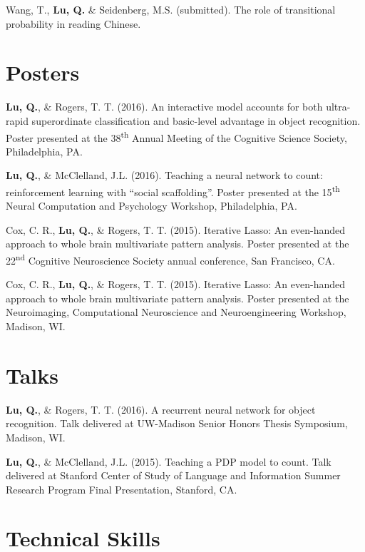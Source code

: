 \documentclass[11pt,a4paper,sans]{moderncv}        %
\newcommand{\ts}{\textsuperscript}
\begin{document}
\hangindent=0.7cm
Wang, T., \textbf{Lu, Q.} \& Seidenberg, M.S. (submitted). The role of transitional probability in reading Chinese. 



\section{Posters}
\hangindent=0.7cm
\textbf{Lu, Q.}, \& Rogers, T. T. (2016). An interactive model accounts for both ultra-rapid superordinate classification and basic-level advantage in object recognition. Poster presented at the 38\ts{th} Annual Meeting of the Cognitive Science Society, Philadelphia, PA.

\hangindent=0.7cm
\textbf{Lu, Q.}, \& McClelland, J.L. (2016). Teaching a neural network to count: reinforcement learning with ``social scaffolding''. Poster presented at the 15\ts{th} Neural Computation and Psychology Workshop, Philadelphia, PA.

\hangindent=0.7cm
Cox, C. R., \textbf{Lu, Q.}, \& Rogers, T. T. (2015). Iterative Lasso: An even-handed approach to whole brain multivariate pattern analysis. Poster presented at the 22\ts{nd} Cognitive Neuroscience Society annual conference, San Francisco, CA.

\hangindent=0.7cm
Cox, C. R., \textbf{Lu, Q.}, \& Rogers, T. T. (2015). Iterative Lasso: An even-handed approach to whole brain multivariate pattern analysis. Poster presented at the Neuroimaging, Computational Neuroscience and Neuroengineering Workshop, Madison, WI.


\section{Talks}
\hangindent=0.7cm
\textbf{Lu, Q.}, \& Rogers, T. T. (2016). A recurrent neural network for object recognition. Talk delivered at UW-Madison Senior Honors Thesis Symposium, Madison, WI.

\hangindent=0.7cm
\textbf{Lu, Q.}, \& McClelland, J.L. (2015). Teaching a PDP model to count. Talk delivered at Stanford Center of Study of Language and Information Summer Research Program Final Presentation, Stanford, CA. 



\section{Technical Skills}
\end{document}
